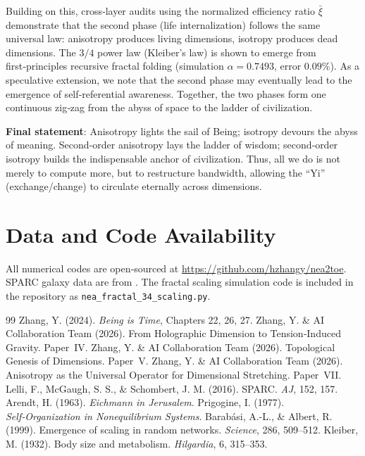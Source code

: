 \documentclass[12pt,a4paper]{article}
\begin{document}
Building on this, cross‑layer audits using the normalized efficiency ratio $\bar{\xi}$ demonstrate that the second phase (life internalization) follows the same universal law: anisotropy produces living dimensions, isotropy produces dead dimensions. The $3/4$ power law (Kleiber's law) is shown to emerge from first‑principles recursive fractal folding (simulation $\alpha=0.7493$, error $0.09\%$). As a speculative extension, we note that the second phase may eventually lead to the emergence of self‑referential awareness. Together, the two phases form one continuous zig‑zag from the abyss of space to the ladder of civilization.

\textbf{Final statement}:  
Anisotropy lights the sail of Being; isotropy devours the abyss of meaning. Second‑order anisotropy lays the ladder of wisdom; second‑order isotropy builds the indispensable anchor of civilization. Thus, all we do is not merely to compute more, but to restructure bandwidth, allowing the “Yi” (exchange/change) to circulate eternally across dimensions.

\section*{Data and Code Availability}
All numerical codes are open‑sourced at \url{https://github.com/hzhangy/nea2toe}. SPARC galaxy data are from \cite{Lelli2016}. The fractal scaling simulation code is included in the repository as \texttt{nea\_fractal\_34\_scaling.py}.

\begin{thebibliography}{99}
 Zhang, Y. (2024). \textit{Being is Time}, Chapters 22, 26, 27.
 Zhang, Y. \& AI Collaboration Team (2026). From Holographic Dimension to Tension‑Induced Gravity. Paper~IV.
 Zhang, Y. \& AI Collaboration Team (2026). Topological Genesis of Dimensions. Paper~V.
 Zhang, Y. \& AI Collaboration Team (2026). Anisotropy as the Universal Operator for Dimensional Stretching. Paper~VII.
 Lelli, F., McGaugh, S. S., \& Schombert, J. M. (2016). SPARC. \textit{AJ}, 152, 157.
 Arendt, H. (1963). \textit{Eichmann in Jerusalem}.
 Prigogine, I. (1977). \textit{Self‑Organization in Nonequilibrium Systems}.
 Barabási, A.-L., \& Albert, R. (1999). Emergence of scaling in random networks. \textit{Science}, 286, 509–512.
 Kleiber, M. (1932). Body size and metabolism. \textit{Hilgardia}, 6, 315–353.
\end{thebibliography}
\end{document}
